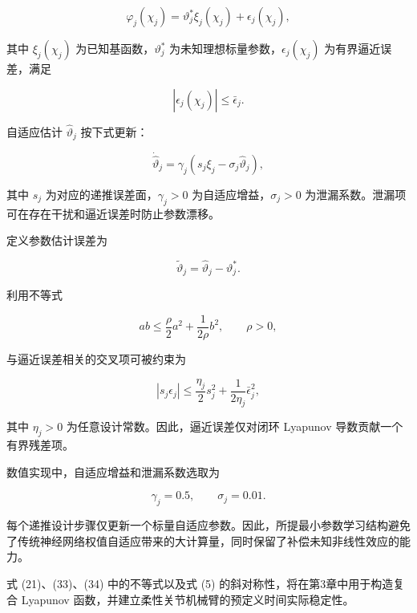 \documentclass{article}
\begin{document}
\begin{equation}
\varphi_j(\chi_j)=\vartheta_j^{*}\xi_j(\chi_j)+\epsilon_j(\chi_j), \tag{29}
\end{equation}

其中 $\xi_j(\chi_j)$ 为已知基函数，$\vartheta_j^{*}$ 为未知理想标量参数，$\epsilon_j(\chi_j)$ 为有界逼近误差，满足

\begin{equation}
|\epsilon_j(\chi_j)|\leq\bar\epsilon_j. \tag{30}
\end{equation}

自适应估计 $\hat\vartheta_j$ 按下式更新：

\begin{equation}
\dot{\hat\vartheta}_j=\gamma_j\left(s_j\xi_j-\sigma_j\hat\vartheta_j\right), \tag{31}
\end{equation}

其中 $s_j$ 为对应的递推误差面，$\gamma_j>0$ 为自适应增益，$\sigma_j>0$ 为泄漏系数。泄漏项可在存在干扰和逼近误差时防止参数漂移。

定义参数估计误差为

\begin{equation}
\tilde\vartheta_j=\hat\vartheta_j-\vartheta_j^{*}. \tag{32}
\end{equation}

利用不等式

\begin{equation}
ab\leq\frac{\rho}{2}a^2+\frac{1}{2\rho}b^2,\qquad \rho>0, \tag{33}
\end{equation}

与逼近误差相关的交叉项可被约束为

\begin{equation}
|s_j\epsilon_j|\leq\frac{\eta_j}{2}s_j^2+\frac{1}{2\eta_j}\bar\epsilon_j^2, \tag{34}
\end{equation}

其中 $\eta_j>0$ 为任意设计常数。因此，逼近误差仅对闭环 Lyapunov 导数贡献一个有界残差项。

数值实现中，自适应增益和泄漏系数选取为

\begin{equation*}
\gamma_j=0.5,\qquad \sigma_j=0.01.
\end{equation*}

每个递推设计步骤仅更新一个标量自适应参数。因此，所提最小参数学习结构避免了传统神经网络权值自适应带来的大计算量，同时保留了补偿未知非线性效应的能力。

式 (21)、(33)、(34) 中的不等式以及式 (5) 的斜对称性，将在第3章中用于构造复合 Lyapunov 函数，并建立柔性关节机械臂的预定义时间实际稳定性。
\end{document}
